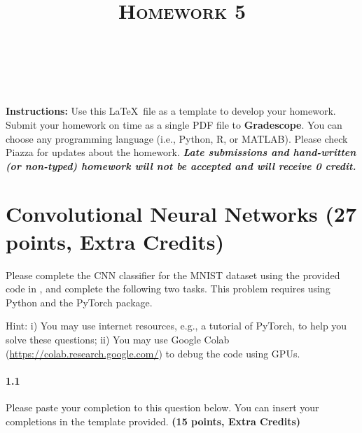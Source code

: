 \documentclass[letter]{article}
\title{\textsc{Homework 5}} %
\author{
\red{$>>$NAME HERE$<<$} \\
\red{$>>$ID HERE$<<$}\\
}
\date{}
\theoremstyle{definition}
\begin{document}
\maketitle 


\textbf{Instructions:} Use this \LaTeX~file as a template to develop your homework. Submit your homework on time as a single PDF file to \textbf{Gradescope}. You can choose any programming language (i.e., Python, R, or MATLAB). Please check Piazza for updates about the homework. \textbf{\em Late submissions and hand-written (or non-typed) homework will not be accepted and will receive 0 credit.}

\vspace{0.1in}



\section{Convolutional Neural Networks (27 points, Extra Credits)}
Please complete the CNN classifier for the MNIST dataset using the provided code in , and complete the following two tasks. This problem requires using Python and the PyTorch package.

Hint: i) You may use internet resources, e.g., a tutorial of PyTorch, to help you solve these questions; ii) You may use Google Colab (\url{https://colab.research.google.com/}) to debug the code using GPUs.

\paragraph{1.1}
Please paste your completion to this question below. You can insert your completions in the template provided. {\bf (15 points, Extra Credits)}
\end{document}

